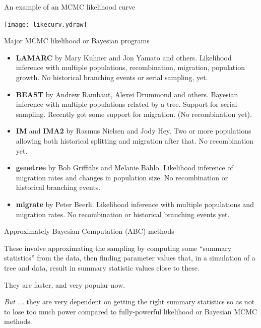 \documentclass[bluish,slideColor,colorBG,pdf]{prosper}
\begin{document}
\begin{slide}[Replace]{An example of an MCMC likelihood curve}

\centerline{\texttt{[image: likecurv.ydraw]}}

\end{slide}

\begin{slide}[Replace]{Major MCMC likelihood or Bayesian programs}

\begin{itemize}
\item {\bf LAMARC} by Mary Kuhner and Jon Yamato and others. Likelihood
inference with multiple
populations, recombination, migration, population growth.  No historical
branching events or serial sampling, yet.
\item {\bf BEAST} by Andrew Rambaut, Alexei Drummond and others.  Bayesian
inference with multiple populations related by a tree. Support for
serial sampling.  Recently got some support for migration. (No recombination yet).
\item {\bf IM} and {\bf IMA2} by Rasmus Nielsen and Jody Hey.  Two or more
populations allowing both historical splitting and migration after that.  No 
recombination yet.
\item {\bf genetree} by Bob Griffiths and Melanie Bahlo. Likelihood
inference of migration rates and changes in population size.  No recombination
or historical branching events.
\item {\bf migrate} by Peter Beerli.  Likelihood inference with multiple
populations and migration rates.  No recombination or historical branching
events yet.
\end{itemize}

\end{slide}

\begin{slide}[Replace]{Approximately Bayesian Computation (ABC) methods}

These involve approximating the sampling by computing some ``summary
statistics'' from the data, then finding parameter values that,
in a simulation of a tree and data,  result in summary statistic values close to these.
\bigskip

They are faster, and very popular now.
\bigskip

{\it But ...} they are very dependent on getting the right summary statistics so as not
to lose too much power compared to fully-powerful likelihood or Bayesian 
MCMC methods.

\end{slide}
\end{document}
